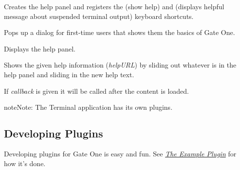 \documentclass[letterpaper,10pt,openany]{sphinxmanual}
\begin{document}
\begin{fulllineitems}
\begin{fulllineitems}
\label{Developer/plugin_help:GateOne.Help.init}
Creates the help panel and registers the  (show help) and  (displays helpful message about suspended terminal output) keyboard shortcuts.

\end{fulllineitems}



\begin{fulllineitems}
\label{Developer/plugin_help:GateOne.Help.showFirstTimeDialog}
Pops up a dialog for first-time users that shows them the basics of Gate One.

\end{fulllineitems}



\begin{fulllineitems}
\label{Developer/plugin_help:GateOne.Help.showHelp}
Displays the help panel.

\end{fulllineitems}



\begin{fulllineitems}
\label{Developer/plugin_help:GateOne.Help.showHelpSection}
Shows the given help information (\emph{helpURL}) by sliding out whatever is in the help panel and sliding in the new help text.

If \emph{callback} is given it will be called after the content is loaded.

\end{fulllineitems}


\end{fulllineitems}


\begin{notice}{note}{Note:}
The Terminal application has its own plugins.
\end{notice}


\subsection{Developing Plugins}
\label{Developer/index:developing-plugins}
Developing plugins for Gate One is easy and fun.  See {\hyperref[Applications/terminal/plugin_example:example-plugin]{\emph{The Example Plugin}}} for how it's done.
\end{document}
